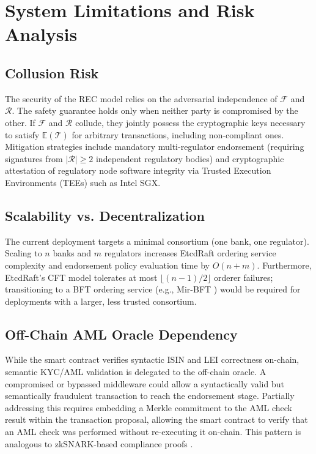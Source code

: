 \documentclass[journal,10pt,twocolumn]{IEEEtran}
\begin{document}
\section{System Limitations and Risk Analysis}
\label{sec:limits}

\subsection{Collusion Risk}

The security of the REC model relies on the adversarial independence of $\mathcal{F}$ and $\mathcal{R}$. The safety guarantee holds only when neither party is compromised by the other. If $\mathcal{F}$ and $\mathcal{R}$ collude, they jointly possess the cryptographic keys necessary to satisfy $\mathbb{E}(\mathcal{T})$ for arbitrary transactions, including non-compliant ones. Mitigation strategies include mandatory multi-regulator endorsement (requiring signatures from $|\mathcal{R}| \geq 2$ independent regulatory bodies) and cryptographic attestation of regulatory node software integrity via Trusted Execution Environments (TEEs) such as Intel SGX.

\subsection{Scalability vs. Decentralization}

The current deployment targets a minimal consortium (one bank, one regulator). Scaling to $n$ banks and $m$ regulators increases EtcdRaft ordering service complexity and endorsement policy evaluation time by $O(n + m)$. Furthermore, EtcdRaft's CFT model tolerates at most $\lfloor(n-1)/2\rfloor$ orderer failures; transitioning to a BFT ordering service (e.g., Mir-BFT \cite{ref:mirbft}) would be required for deployments with a larger, less trusted consortium.

\subsection{Off-Chain AML Oracle Dependency}

While the smart contract verifies syntactic ISIN and LEI correctness on-chain, semantic KYC/AML validation is delegated to the off-chain oracle. A compromised or bypassed middleware could allow a syntactically valid but semantically fraudulent transaction to reach the endorsement stage. Partially addressing this requires embedding a Merkle commitment to the AML check result within the transaction proposal, allowing the smart contract to verify that an AML check was performed without re-executing it on-chain. This pattern is analogous to zkSNARK-based compliance proofs \cite{ref:zksnark_compliance}.
\end{document}
